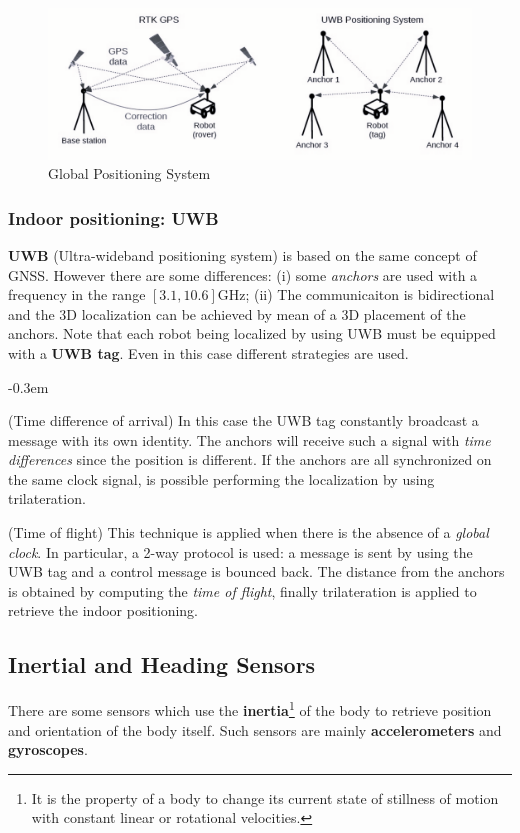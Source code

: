 \begin{figure}[h]
    \centering
    \includegraphics[scale=0.7]{img/sensor_GPS.png}
    \caption{Global Positioning System}
\end{figure}

\subsubsection{Indoor positioning: UWB}
\textbf{UWB} (Ultra-wideband positioning system) is based on the same concept of GNSS. However there are some differences: (i) some \textit{anchors} are used with a frequency in the range $[3.1,10.6]$GHz; (ii) The communicaiton is bidirectional and the 3D localization can be achieved by mean of a 3D placement of the anchors. Note that each robot being localized by using UWB must be equipped with a \textbf{UWB tag}. Even in this case different strategies are used.

\begin{description}
    \itemsep-0.3em
    \item[TDOA] (Time difference of arrival) In this case the UWB tag constantly broadcast a message with its own identity. The anchors will receive such a signal with \textit{time differences} since the position is different. If the anchors are all synchronized on the same clock signal, is possible performing the localization by using trilateration.
    \item[TOF] (Time of flight) This technique is applied when there is the absence of a \textit{global clock}. In particular, a 2-way protocol is used: a message is sent by using the UWB tag and a control message is bounced back. The distance from the anchors is obtained by computing the \textit{time of flight}, finally trilateration is applied to retrieve the indoor positioning.
\end{description}

\subsection{Inertial and Heading Sensors}
There are some sensors which use the \textbf{inertia}\footnote{
    It is the property of a body to change its current state of stillness of motion with constant linear or rotational velocities.
} of the body to retrieve position and orientation of the body itself. Such sensors are mainly \textbf{accelerometers} and \textbf{gyroscopes}.

